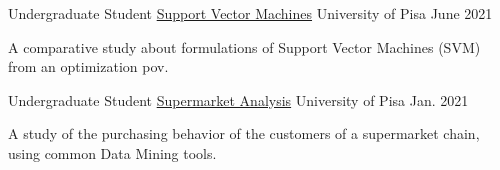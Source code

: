 

\begin{cventries}

  \cventry
    {Undergraduate Student} %
    {\href{https://github.com/dmeoli/optiml/blob/master/notebooks/optimization/tex/CM_report.pdf}{Support Vector Machines}} %
    {University of Pisa} %
    {June 2021} %
    {
      \begin{cvitems} %
        \item {A comparative study about formulations of Support Vector Machines (SVM) from an optimization pov.}
      \end{cvitems}
    }

  \cventry
    {Undergraduate Student} %
    {\href{https://github.com/dmeoli/OnlineRetail/blob/master/tex/DM_Report_Group18.pdf}{Supermarket Analysis}} %
    {University of Pisa} %
    {Jan. 2021} %
    {
      \begin{cvitems} %
        \item {A study of the purchasing behavior of the customers of a supermarket chain, using common Data Mining tools.}
      \end{cvitems}
    }

\end{cventries}
